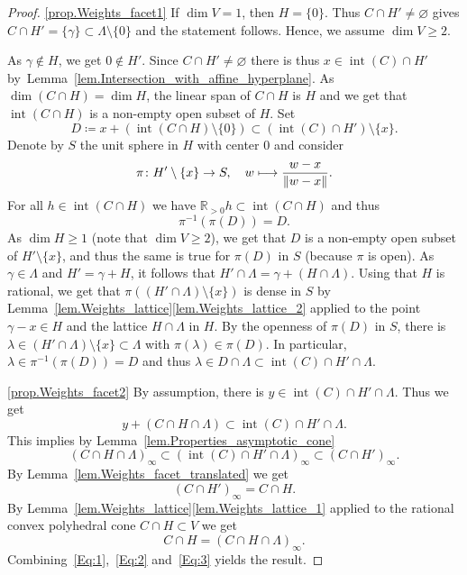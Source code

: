 \documentclass[11pt]{article}
\newcommand{\skpt}{\smallskip}
\numberwithin{equation}{section}
\def\mto{\mathchoice{\longmapsto}{\mapsto}{\mapsto}{\mapsto}}
\theoremstyle{plain}
\theoremstyle{definition}
\DeclareMathOperator{\inter}{int}
\newcommand{\norm}[1]{\left\lVert#1\right\rVert}
\newcommand{\RR}{\mathbb{R}}
\begin{document}
\skpt
\begin{proof}
\eqref{prop.Weights_facet1}
If $\dim V = 1$, then $H = \{0\}$. Thus
$C \cap H' \neq \varnothing$ gives $C \cap H' = \{\gamma\} \subset \Lambda \setminus \{0\}$ and
the statement follows. Hence, we assume $\dim V \geq 2$.

As $\gamma \not\in H$, we get $0 \not\in H'$.
Since $C \cap H' \neq \varnothing$ there is thus $x \in \inter(C) \cap H'$
by~Lemma~\ref{lem.Intersection_with_affine_hyperplane}.
As $\dim(C \cap H) = \dim H$, the linear
span of $C \cap H$ is $H$ and we get that
$\inter(C \cap H)$ is a non-empty open subset of $H$. Set
\[
D \coloneqq x + (\inter(C\cap H) \setminus \{0\}) \subset (\inter(C) \cap H') \setminus \{x\}.
\]
Denote by $S$ the unit sphere in $H$ with center $0$ and consider
\[
\pi \colon H' \setminus \{x\} \to S, \quad w \mto \frac{w-x}{\norm{w-x}}.
\]
For all $h \in \inter(C \cap H)$ we have $\RR_{> 0}h \subset \inter(C \cap H)$ and thus
\[
\pi^{-1}(\pi(D)) = D.
\]
As $\dim H \geq 1$ (note that $\dim V \geq 2$), we get that $D$ is a non-empty open subset of $H' \setminus \{x\}$, and thus
the same is true
for $\pi(D)$ in $S$ (because $\pi$ is open). As
$\gamma \in \Lambda$ and $H' = \gamma + H$, it follows that
$H' \cap \Lambda = \gamma + (H \cap \Lambda)$. Using that $H$ is rational,
we get that
$\pi((H' \cap \Lambda) \setminus \{x\})$ is dense in $S$ by Lemma~\ref{lem.Weights_lattice}\eqref{lem.Weights_lattice_2} applied to the point $\gamma - x \in H$
and the lattice $H \cap \Lambda$ in $H$.
By the openness of $\pi(D)$ in $S$,
there is $\lambda \in (H' \cap \Lambda) \setminus \{x\} \subset \Lambda$
with $\pi(\lambda) \in \pi(D)$.
In particular, $\lambda \in \pi^{-1}(\pi(D)) = D$ and thus
$\lambda \in D \cap \Lambda \subset \inter(C) \cap H' \cap \Lambda$.

\eqref{prop.Weights_facet2} By assumption, there is $y \in \inter(C) \cap H' \cap \Lambda$. Thus
we get
\[
y + (C \cap H \cap \Lambda) \subset \inter(C) \cap H' \cap \Lambda.
\]
This implies by Lemma~\ref{lem.Properties_asymptotic_cone}
\[
\label{Eq:1}
\tag{a}
(C \cap H \cap \Lambda)_{\infty} \subset (\inter(C) \cap H' \cap \Lambda)_{\infty}
\subset (C \cap H')_{\infty}.
\]
By Lemma~\ref{lem.Weights_facet_translated} we get
\[
\label{Eq:2}
\tag{b}
(C \cap H')_{\infty} = C \cap H.
\]
By Lemma~\ref{lem.Weights_lattice}\eqref{lem.Weights_lattice_1}
applied to the rational convex polyhedral cone
$C \cap H \subset V$ we get
\[
\label{Eq:3}
\tag{c}
C \cap H = (C \cap H \cap \Lambda)_{\infty}.
\]
Combining~\eqref{Eq:1},~\eqref{Eq:2} and~\eqref{Eq:3} yields the result.
\end{proof}
\end{document}

